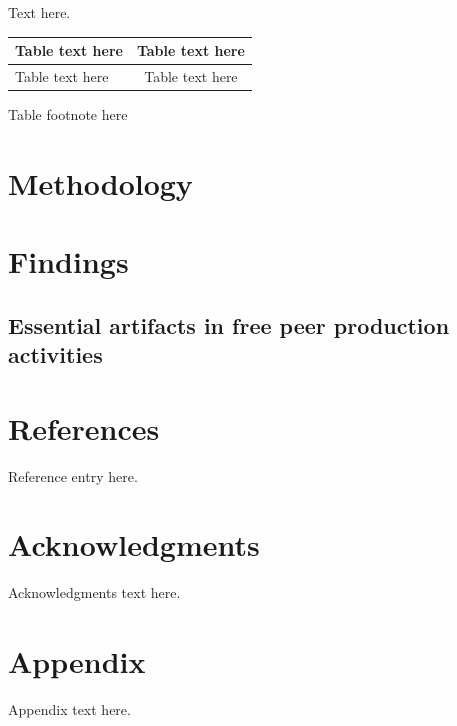\documentclass{ICED-Paper}%
\begin{document}
Text here.

\begin{table}
{\tabcolsep=2pc\begin{tabular}{|l|c|}%
\hline
Table text here & Table text here\\%
\hline
Table text here & Table text here\\%
\hline
\end{tabular}}{Table footnote here}
\end{table}

\section{Methodology}


\section{Findings}
\subsection{Essential artifacts in free peer production activities}

\subsection{}

\section*{References}

\begin{thebibliography}

Reference entry here.

\end{thebibliography}

\section*{Acknowledgments}

Acknowledgments text here.

\appendix

\section*{Appendix}

Appendix text here.
\end{document}
